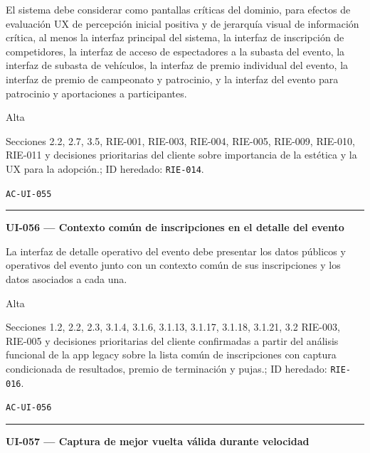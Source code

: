\documentclass[10pt,letterpaper]{article}
\begin{document}
\begin{description}[style=nextline,leftmargin=3.15cm,labelwidth=2.8cm,font=\normalfont\bfseries]
\item[Obligación] El sistema debe considerar como pantallas críticas del dominio, para efectos de evaluación UX de percepción inicial positiva y de jerarquía visual de información crítica, al menos la interfaz principal del sistema, la interfaz de inscripción de competidores, la interfaz de acceso de espectadores a la subasta del evento, la interfaz de subasta de vehículos, la interfaz de premio individual del evento, la interfaz de premio de campeonato y patrocinio, y la interfaz del evento para patrocinio y aportaciones a participantes.
\item[Prioridad] Alta
\item[Procedencia] Secciones 2.2, 2.7, 3.5, RIE-001, RIE-003, RIE-004, RIE-005, RIE-009, RIE-010, RIE-011 y decisiones prioritarias del cliente sobre importancia de la estética y la UX para la adopción.; ID heredado: \texttt{RIE-014}.
\item[Verificación] \texttt{AC-UI-055}
\end{description}
\vspace{0.25em}\hrule\vspace{0.65em}
\noindent\textbf{UI-056 --- Contexto común de inscripciones en el detalle del evento}\par
\begin{description}[style=nextline,leftmargin=3.15cm,labelwidth=2.8cm,font=\normalfont\bfseries]
\item[Obligación] La interfaz de detalle operativo del evento debe presentar los datos públicos y operativos del evento junto con un contexto común de sus inscripciones y los datos asociados a cada una.
\item[Prioridad] Alta
\item[Procedencia] Secciones 1.2, 2.2, 2.3, 3.1.4, 3.1.6, 3.1.13, 3.1.17, 3.1.18, 3.1.21, 3.2 RIE-003, RIE-005 y decisiones prioritarias del cliente confirmadas a partir del análisis funcional de la app legacy sobre la lista común de inscripciones con captura condicionada de resultados, premio de terminación y pujas.; ID heredado: \texttt{RIE-016}.
\item[Verificación] \texttt{AC-UI-056}
\end{description}
\vspace{0.25em}\hrule\vspace{0.65em}
\noindent\textbf{UI-057 --- Captura de mejor vuelta válida durante velocidad}\par
\end{document}
